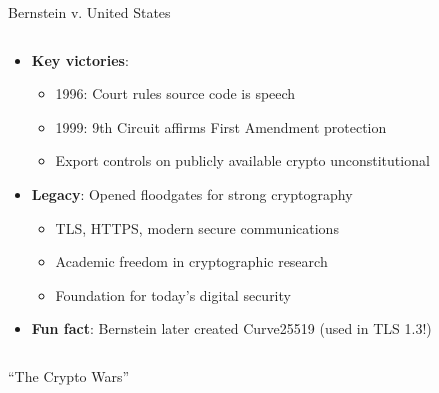 \documentclass[aspectratio=169, lualatex, handout]{beamer}
\begin{document}
\begin{frame}{Bernstein v. United States}
	\begin{columns}[c]
		\begin{column}{0.7\textwidth}
			\begin{itemize}
				\item \textbf{Key victories}:
				      \begin{itemize}
					      \item 1996: Court rules source code is speech
					      \item 1999: 9th Circuit affirms First Amendment protection
					      \item Export controls on publicly available crypto unconstitutional
				      \end{itemize}
				\item \textbf{Legacy}: Opened floodgates for strong cryptography
				      \begin{itemize}
					      \item TLS, HTTPS, modern secure communications
					      \item Academic freedom in cryptographic research
					      \item Foundation for today's digital security
				      \end{itemize}
				\item \textbf{Fun fact}: Bernstein later created Curve25519 (used in TLS 1.3!)
			\end{itemize}
		\end{column}
		\begin{column}{0.3\textwidth}
		\end{column}
	\end{columns}
\end{frame}

\begin{frame}{``The Crypto Wars''}
	\begin{columns}[c]
		\begin{column}{0.33\textwidth}
		\end{column}
		\begin{column}{0.33\textwidth}
		\end{column}
		\begin{column}{0.33\textwidth}
		\end{column}
	\end{columns}
\end{frame}
\end{document}

